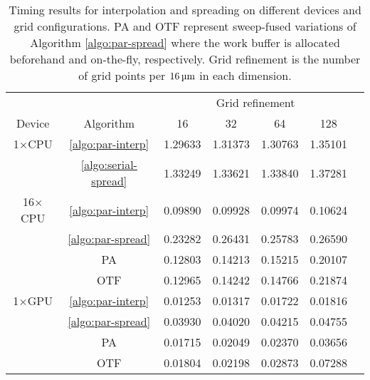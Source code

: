 \begin{table}
    \label{tab:grid-timing}
    \begin{center}
    \bgroup
    \renewcommand{\arraystretch}{1.7}
    \begin{tabular}{ccccccc}
                                                                                              \toprule
                      &                          & \multicolumn{4}{c}{Grid refinement}   \\ \cline{3-6}
        Device        & Algorithm                & 16      & 32      & 64      & 128     \\ \midrule
        1$\times$CPU  & \ref{algo:par-interp}    & 1.29633 & 1.31373 & 1.30763 & 1.35101 \\
                      & \ref{algo:serial-spread} & 1.33249 & 1.33621 & 1.33840 & 1.37281 \\ \midrule
        16$\times$CPU & \ref{algo:par-interp}    & 0.09890 & 0.09928 & 0.09974 & 0.10624 \\
                      & \ref{algo:par-spread}    & 0.23282 & 0.26431 & 0.25783 & 0.26590 \\
                      & PA                       & 0.12803 & 0.14213 & 0.15215 & 0.20107 \\
                      & OTF                      & 0.12965 & 0.14242 & 0.14766 & 0.21874 \\ \midrule
        1$\times$GPU  & \ref{algo:par-interp}    & 0.01253 & 0.01317 & 0.01722 & 0.01816 \\
                      & \ref{algo:par-spread}    & 0.03930 & 0.04020 & 0.04215 & 0.04755 \\
                      & PA                       & 0.01715 & 0.02049 & 0.02370 & 0.03656 \\
                      & OTF                      & 0.01804 & 0.02198 & 0.02873 & 0.07288 \\ \bottomrule
    \end{tabular}
    \egroup
    \end{center}
    \caption{%
        Timing results for interpolation and spreading on different devices and
        grid configurations. PA and OTF represent sweep-fused variations of
        Algorithm \ref{algo:par-spread} where the work buffer is
        allocated beforehand and on-the-fly, respectively. Grid refinement
        is the number of grid points per $16\um$ in each dimension.
    }
\end{table}

